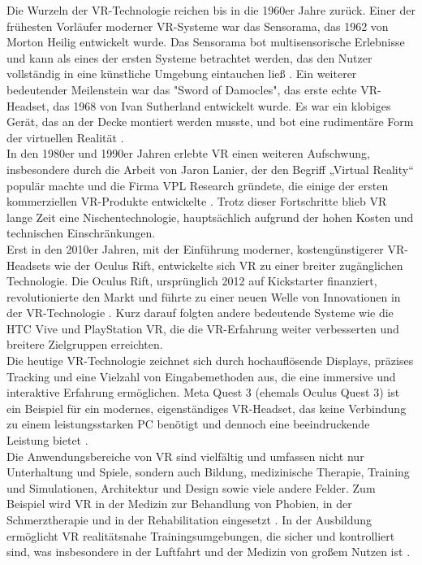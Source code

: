 \noindent
Die Wurzeln der VR-Technologie reichen bis in die 1960er Jahre zurück. Einer der frühesten Vorläufer moderner VR-Systeme war das Sensorama, das 1962 von Morton Heilig entwickelt wurde. Das Sensorama bot multisensorische Erlebnisse und kann als eines der ersten Systeme betrachtet werden, das den Nutzer vollständig in eine künstliche Umgebung eintauchen ließ \cite{heilig1962}. Ein weiterer bedeutender Meilenstein war das "Sword of Damocles", das erste echte VR-Headset, das 1968 von Ivan Sutherland entwickelt wurde. Es war ein klobiges Gerät, das an der Decke montiert werden musste, und bot eine rudimentäre Form der virtuellen Realität \cite{sutherland1968}.
\\

\noindent
In den 1980er und 1990er Jahren erlebte VR einen weiteren Aufschwung, insbesondere durch die Arbeit von Jaron Lanier, der den Begriff „Virtual Reality“ populär machte und die Firma VPL Research gründete, die einige der ersten kommerziellen VR-Produkte entwickelte \cite{lanier1992}. Trotz dieser Fortschritte blieb VR lange Zeit eine Nischentechnologie, hauptsächlich aufgrund der hohen Kosten und technischen Einschränkungen.
\\

\noindent
Erst in den 2010er Jahren, mit der Einführung moderner, kostengünstigerer VR-Headsets wie der Oculus Rift, entwickelte sich VR zu einer breiter zugänglichen Technologie. Die Oculus Rift, ursprünglich 2012 auf Kickstarter finanziert, revolutionierte den Markt und führte zu einer neuen Welle von Innovationen in der VR-Technologie \cite{luckey2012}. Kurz darauf folgten andere bedeutende Systeme wie die HTC Vive und PlayStation VR, die die VR-Erfahrung weiter verbesserten und breitere Zielgruppen erreichten.
\\

\noindent
Die heutige VR-Technologie zeichnet sich durch hochauflösende Displays, präzises Tracking und eine Vielzahl von Eingabemethoden aus, die eine immersive und interaktive Erfahrung ermöglichen. Meta Quest 3 (ehemals Oculus Quest 3) ist ein Beispiel für ein modernes, eigenständiges VR-Headset, das keine Verbindung zu einem leistungsstarken PC benötigt und dennoch eine beeindruckende Leistung bietet \cite{meta2023}.
\\

\noindent
Die Anwendungsbereiche von VR sind vielfältig und umfassen nicht nur Unterhaltung und Spiele, sondern auch Bildung, medizinische Therapie, Training und Simulationen, Architektur und Design sowie viele andere Felder. Zum Beispiel wird VR in der Medizin zur Behandlung von Phobien, in der Schmerztherapie und in der Rehabilitation eingesetzt \cite{rizzo2017}. In der Ausbildung ermöglicht VR realitätsnahe Trainingsumgebungen, die sicher und kontrolliert sind, was insbesondere in der Luftfahrt und der Medizin von großem Nutzen ist \cite{huang2018}.
\\

